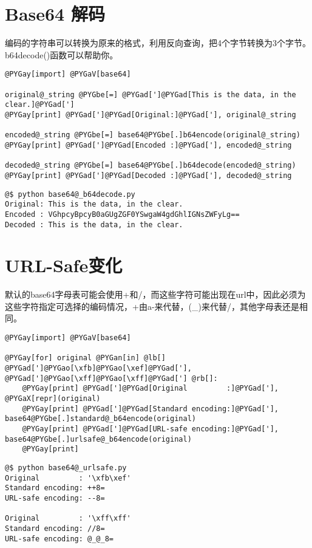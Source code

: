 \documentclass[a4paper,10pt,english]{manual}
\begin{document}
\section{Base64 解码}

编码的字符串可以转换为原来的格式，利用反向查询，把4个字节转换为3个字节。b64decode()函数可以帮助你。

\begin{Verbatim}[commandchars=@\[\]]
@PYGay[import] @PYGaV[base64]

original@_string @PYGbe[=] @PYGad[']@PYGad[This is the data, in the clear.]@PYGad[']
@PYGay[print] @PYGad[']@PYGad[Original:]@PYGad['], original@_string

encoded@_string @PYGbe[=] base64@PYGbe[.]b64encode(original@_string)
@PYGay[print] @PYGad[']@PYGad[Encoded :]@PYGad['], encoded@_string

decoded@_string @PYGbe[=] base64@PYGbe[.]b64decode(encoded@_string)
@PYGay[print] @PYGad[']@PYGad[Decoded :]@PYGad['], decoded@_string
\end{Verbatim}

\begin{Verbatim}[commandchars=@\[\]]
@$ python base64@_b64decode.py
Original: This is the data, in the clear.
Encoded : VGhpcyBpcyB0aGUgZGF0YSwgaW4gdGhlIGNsZWFyLg==
Decoded : This is the data, in the clear.
\end{Verbatim}


\section{URL-Safe变化}

默认的base64字母表可能会使用+和/，而这些字符可能出现在url中，因此必须为这些字符指定可选择的编码情况，+由a-来代替，(\_)来代替/，其他字母表还是相同。

\begin{Verbatim}[commandchars=@\[\]]
@PYGay[import] @PYGaV[base64]

@PYGay[for] original @PYGan[in] @lb[] @PYGad[']@PYGao[\xfb]@PYGao[\xef]@PYGad['], @PYGad[']@PYGao[\xff]@PYGao[\xff]@PYGad['] @rb[]:
    @PYGay[print] @PYGad[']@PYGad[Original         :]@PYGad['], @PYGaX[repr](original)
    @PYGay[print] @PYGad[']@PYGad[Standard encoding:]@PYGad['], base64@PYGbe[.]standard@_b64encode(original)
    @PYGay[print] @PYGad[']@PYGad[URL-safe encoding:]@PYGad['], base64@PYGbe[.]urlsafe@_b64encode(original)
    @PYGay[print]
\end{Verbatim}

\begin{Verbatim}[commandchars=@\[\]]
@$ python base64@_urlsafe.py
Original         : '\xfb\xef'
Standard encoding: ++8=
URL-safe encoding: --8=

Original         : '\xff\xff'
Standard encoding: //8=
URL-safe encoding: @_@_8=
\end{Verbatim}
\end{document}
